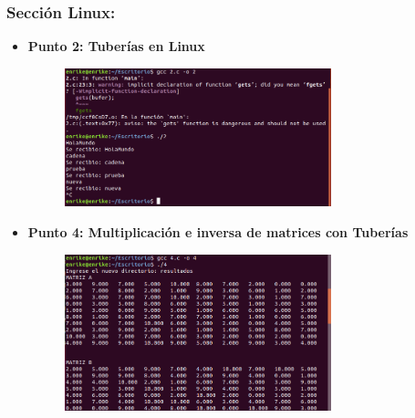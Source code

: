 \documentclass[12pt]{article}
\begin{document}
      \subsubsection{Sección Linux:}
      \begin{itemize}
      
          \item[\Checkmark] \textbf{Punto 2: Tuberías en Linux} 
                \begin{figure}[h!]
                        \centering
                       \includegraphics[width=0.73\textwidth]{Practica6/Images/Linux/2.png}
                \end{figure}

            \item[\Checkmark]{\textbf{Punto 4: Multiplicación e inversa de matrices con Tuberías}}
                
          \begin{figure}[h!]
              \centering
            \includegraphics[width=0.73\textwidth]{Practica6/Images/Linux/4_1.png}
              

\end{figure}
\end{itemize}
\end{document}

